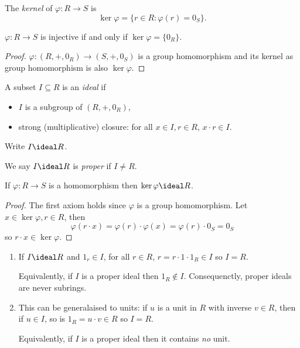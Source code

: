 \documentclass[a4paper]{article}
\theoremstyle{definition}
\begin{document}
The \emph{kernel} of \(\varphi: R \to S\) is
\[
  \ker \varphi = \{r\in R: \varphi(r) = 0_S\}.
\]

\begin{lemma}
  \(\varphi:R \to S\) is injective if and only if \(\ker \varphi = \{0_R\}\).
\end{lemma}

\begin{proof}
  \(\varphi: (R, +, 0_R) \to (S, +, 0_S)\) is a group homomorphism and its kernel as group homomorphism is also \(\ker \varphi\).
\end{proof}

\begin{definition}[Ideal]
  A subset \(I \subseteq R\) is an \emph{ideal} if
  \begin{itemize}
  \item \(I\) is a subgroup of \((R, +, 0_R)\),
  \item strong (multiplicative) closure: for all \(x \in I, r \in R\), \(x \cdot r \in I\).
  \end{itemize}
  Write \(I \ideal R\).
\end{definition}

We say \(I \ideal R\) is \emph{proper} if \(I \neq R\).

\begin{lemma}
  If \(\varphi: R \to S\) is a homomorphism then \(\ker \varphi \ideal R\).
\end{lemma}

\begin{proof}
  The first axiom holds since \(\varphi\) is a group homomorphism. Let \(x \in \ker \varphi, r \in R\), then
  \[
    \varphi(r \cdot x) = \varphi(r) \cdot \varphi(x) = \varphi(r) \cdot 0_S = 0_S
  \]
  so \(r \cdot x \in \ker \varphi\).
\end{proof}

\begin{eg}\leavevmode
  \begin{enumerate}
  \item If \(I \ideal R\) and \(1_r \in I\), for all \(r \in R\), \(r = r \cdot 1 \cdot 1_R \in I\) so \(I = R\).

    Equivalently, if \(I\) is a proper ideal then \(1_R \notin I\). Consequenctly, proper ideals are never subrings.
  \item This can be generalaised to units: if \(u\) is a unit in \(R\) with inverse \(v \in R\), then if \(u \in I\), so is \(1_R = u \cdot v \in R\) so \(I = R\).

    Equivalently, if \(I\) is a proper ideal then it contains \emph{no} unit.
  \end{enumerate}
\end{eg}
\end{document}
